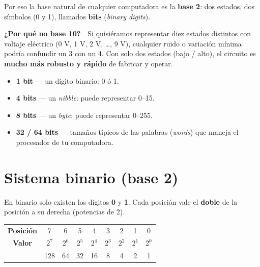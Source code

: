 \documentclass[12pt, oneside]{article}
\begin{document}
Por eso la base natural de cualquier computadora es la \textbf{base 2}:
dos estados, dos símbolos (0 y 1), llamados \textbf{bits}
(\textit{binary digits}).

\begin{recuerda}
  \textbf{¿Por qué no base 10?}\ \ Si quisiéramos representar diez estados
  distintos con voltaje eléctrico (0 V, 1 V, 2 V, \ldots, 9 V), cualquier
  ruido o variación mínima podría confundir un 3 con un 4. Con solo dos
  estados (bajo / alto), el circuito es \textbf{mucho más robusto y rápido}
  de fabricar y operar.
\end{recuerda}

\begin{tecnico}
  \begin{itemize}
    \item \textbf{1 bit} — un dígito binario: 0 ó 1.
    \item \textbf{4 bits} — un \textit{nibble}: puede representar 0–15.
    \item \textbf{8 bits} — un \textit{byte}: puede representar 0–255.
    \item \textbf{32 / 64 bits} — tamaños típicos de las palabras
          (\textit{words}) que maneja el procesador de tu computadora.
  \end{itemize}
\end{tecnico}

\section{Sistema binario (base 2)}

En binario solo existen los dígitos \textbf{0} y \textbf{1}.
Cada posición vale el \textbf{doble} de la posición a su derecha
(potencias de 2).

\begin{center}
\begin{tabular}{ccccccccc}
  \toprule
  \textbf{Posición} & 7 & 6 & 5 & 4 & 3 & 2 & 1 & 0 \\
  \textbf{Valor}    & $2^7$ & $2^6$ & $2^5$ & $2^4$ & $2^3$ & $2^2$ & $2^1$ & $2^0$ \\
                    & 128 & 64 & 32 & 16 & 8 & 4 & 2 & 1 \\
  \bottomrule
\end{tabular}
\end{center}
\end{document}
